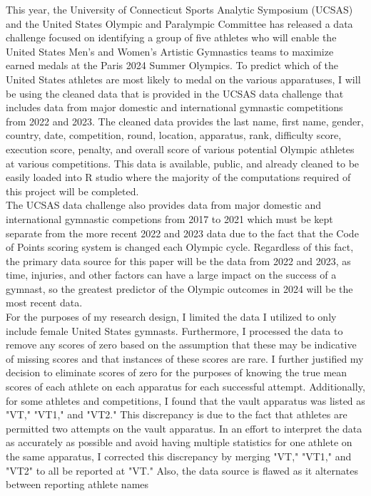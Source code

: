 \documentclass[12pt]{article}
\begin{document}
This year, the University of Connecticut Sports Analytic Symposium (UCSAS) and the United States 
Olympic and Paralympic Committee has released a data challenge focused on identifying a group of 
five athletes who will enable the United States Men's and Women's Artistic Gymnastics teams to 
maximize earned medals at the Paris 2024 Summer Olympics. To predict which of the United States 
athletes are most likely to medal on the various apparatuses, I will be using the cleaned data that 
is provided in the UCSAS data challenge that includes data from major domestic and international 
gymnastic competitions from 2022 and 2023. The cleaned data provides the last name, first name, gender, 
country, date, competition, round, location, apparatus, rank, difficulty score, execution score, penalty, 
and overall score of various potential Olympic athletes at various competitions. This data is available, 
public, and already cleaned to be easily loaded into R studio where the majority of the computations 
required of this project will be completed. 
\\
The UCSAS data challenge also provides data from major domestic
and international gymnastic competions from 2017 to 2021 which must be kept separate from the more recent 2022 
and 2023 data due to the fact that the Code of Points scoring system is changed each Olympic cycle. Regardless 
of this fact, the primary data source for this paper will be the data from 2022 and 2023, as time, injuries, 
and other factors can have a large impact on the success of a gymnast, so the greatest predictor
of the Olympic outcomes in 2024 will be the most recent data.
\\
For the purposes of my research design, I limited the data I utilized to only include female United States
gymnasts. Furthermore, I processed the data to remove any scores of zero based on the assumption that these may 
be indicative of missing scores and that instances of these scores are rare. I further justified my decision 
to eliminate scores of zero for the purposes of knowing the true mean scores of each athlete on each 
apparatus for each successful attempt. Additionally, for some athletes and competitions, I found that the vault
apparatus was listed as "VT," "VT1," and "VT2." This discrepancy is due to the fact that athletes are permitted
two attempts on the vault apparatus. In an effort to interpret the data as accurately as possible and avoid having 
multiple statistics for one athlete on the same apparatus, I corrected this discrepancy by merging "VT," "VT1," and 
"VT2" to all be reported at "VT." Also, the data source is flawed as it alternates between reporting athlete names
\end{document}
